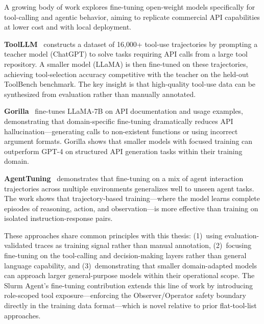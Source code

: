 A growing body of work explores fine-tuning open-weight models specifically for tool-calling and agentic behavior, aiming to replicate commercial API capabilities at lower cost and with local deployment.

\textbf{ToolLLM}~\cite{qin2023toolllm} constructs a dataset of 16{,}000+ tool-use trajectories by prompting a teacher model (ChatGPT) to solve tasks requiring API calls from a large tool repository. A smaller model (LLaMA) is then fine-tuned on these trajectories, achieving tool-selection accuracy competitive with the teacher on the held-out ToolBench benchmark. The key insight is that high-quality tool-use data can be synthesized from evaluation rather than manually annotated.

\textbf{Gorilla}~\cite{patil2023gorilla} fine-tunes LLaMA-7B on API documentation and usage examples, demonstrating that domain-specific fine-tuning dramatically reduces API hallucination---generating calls to non-existent functions or using incorrect argument formats. Gorilla shows that smaller models with focused training can outperform GPT-4 on structured API generation tasks within their training domain.

\textbf{AgentTuning}~\cite{zeng2023agenttuning} demonstrates that fine-tuning on a mix of agent interaction trajectories across multiple environments generalizes well to unseen agent tasks. The work shows that trajectory-based training---where the model learns complete episodes of reasoning, action, and observation---is more effective than training on isolated instruction-response pairs.

These approaches share common principles with this thesis: (1)~using evaluation-validated traces as training signal rather than manual annotation, (2)~focusing fine-tuning on the tool-calling and decision-making layers rather than general language capability, and (3)~demonstrating that smaller domain-adapted models can approach larger general-purpose models within their operational scope. The Slurm Agent's fine-tuning contribution extends this line of work by introducing role-scoped tool exposure---enforcing the Observer/Operator safety boundary directly in the training data format---which is novel relative to prior flat-tool-list approaches.
